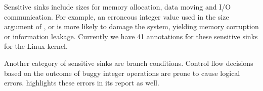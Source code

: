 Sensitive sinks include sizes for memory allocation, data moving and I/O
communication. For example, an erroneous integer value used in the size
argument of ,  or 
is more likely to damage the system, yielding memory corruption or 
information leakage.  Currently we have 41 annotations for these sensitive
sinks for the Linux kernel.

Another category of sensitive sinks are branch conditions. Control flow
decisions based on the outcome of buggy integer operations are prone to cause
logical errors. \sys highlights these errors in its report as well.

